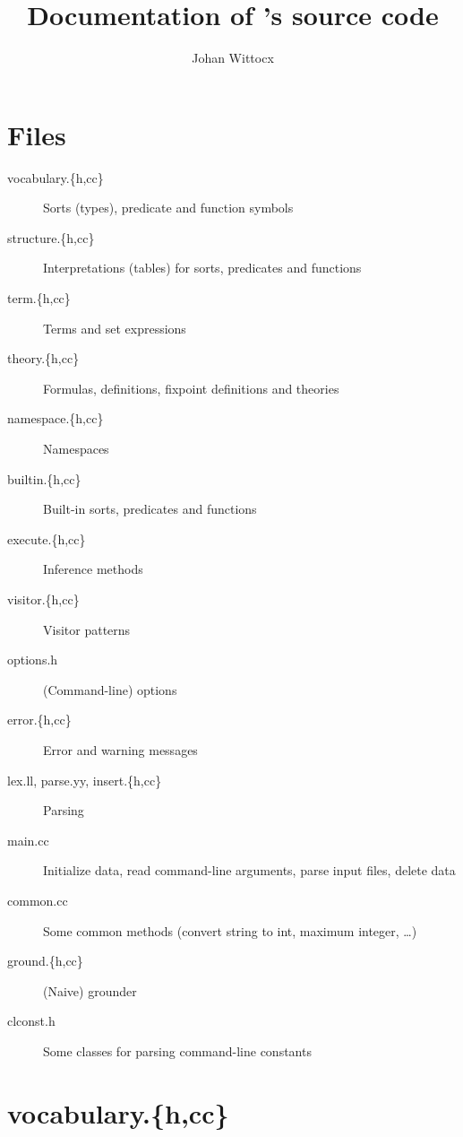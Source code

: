 \documentclass{article}
\title{Documentation of \gidl's source code}
\author{Johan Wittocx}
\begin{document}
\maketitle

\section{Files}

\begin{description}
	\item[vocabulary.\{h,cc\}] Sorts (types), predicate and function symbols
	\item[structure.\{h,cc\}] Interpretations (tables) for sorts, predicates and functions
	\item[term.\{h,cc\}] Terms and set expressions
	\item[theory.\{h,cc\}] Formulas, definitions, fixpoint definitions and theories
	\item[namespace.\{h,cc\}] Namespaces
	\item[builtin.\{h,cc\}] Built-in sorts, predicates and functions
	\item[execute.\{h,cc\}] Inference methods
	\item[visitor.\{h,cc\}] Visitor patterns
	\item[options.h] (Command-line) options
	\item[error.\{h,cc\}] Error and warning messages
	\item[lex.ll, parse.yy, insert.\{h,cc\}] Parsing
	\item[main.cc] Initialize data, read command-line arguments, parse input files, delete data
	\item[common.cc] Some common methods (convert string to int, maximum integer, \ldots)
	\item[ground.\{h,cc\}] (Naive) grounder
	\item[clconst.h] Some classes for parsing command-line constants
\end{description}

\section{vocabulary.\{h,cc\}}

\end{document}
